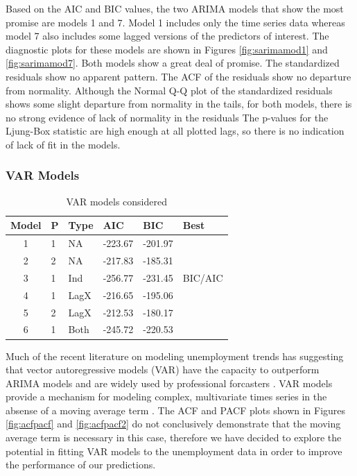 \documentclass[twoside,twocolumn]{article}
\begin{document}
     
     
		Based on the AIC and BIC values, the two ARIMA models that show the most promise are models 1 and 7.  Model 1 includes only the time series data whereas model 7 also includes some lagged versions of the predictors of interest.  The diagnostic plots for these models are shown in Figures \ref{fig:sarimamod1} and \ref{fig:sarimamod7}. Both models show a great deal of promise.  The standardized residuals show no apparent pattern. The ACF of the residuals show no departure from normality. Although the Normal Q-Q plot of the standardized residuals shows some slight departure from normality in the tails, for both models, there is no strong evidence of lack of normality in the residuals  The p-values for the  Ljung-Box statistic are high enough at all plotted lags, so there is no indication of lack of fit in the models. 

      
      \subsubsection{VAR Models}
\begin{table}[htb]
\centering
\caption{VAR models considered}
\label{tab:varchoices}
\begin{tabular}{clllll}
  \hline
 Model & P & Type &  AIC & BIC & Best \\ 
  \hline
1  & 1 & NA  &  -223.67 & -201.97 &  \\ 
  2  & 2 & NA  &   -217.83 & -185.31 &  \\ 
  3  & 1 & Ind  & -256.77 & -231.45 & BIC/AIC \\ 
  4  & 1 & LagX & -216.65 & -195.06 &  \\ 
  5  & 2 & LagX & -212.53 & -180.17 &  \\ 
  6  & 1 & Both  & -245.72 & -220.53 &  \\ 
   \hline
\end{tabular}
\end{table}


      
     Much of the recent literature on modeling unemployment trends has suggesting that vector autoregressive models (VAR) have the capacity to outperform ARIMA models and are widely used by professional forcasters \citep{Meyer2015, Tasci2015, Barnichon2016}. VAR models provide a mechanism for modeling complex, multivariate times series in the absense of a moving average term \citep{Chatfield2001} . The ACF and PACF plots shown in Figures \ref{fig:acfpacf} and \ref{fig:acfpacf2} do not conclusively demonstrate that the moving average term is necessary in this case, therefore we have decided to explore the potential in fitting VAR models to the unemployment data in order to improve the performance of our predictions.  
\end{document}

